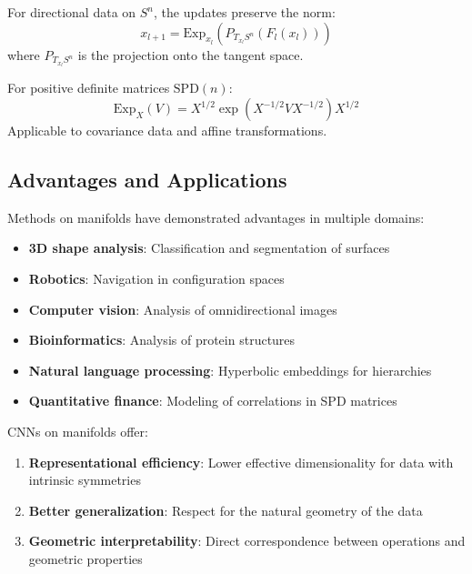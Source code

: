\begin{example}[Spheres (\(S^n\))]
For directional data on \(S^n\), the updates preserve the norm:
\[
x_{l+1} = \text{Exp}_{x_l}(P_{T_{x_l}S^n}(F_l(x_l)))
\]
where \(P_{T_{x_l}S^n}\) is the projection onto the tangent space.
\end{example}

\begin{example}
For positive definite matrices \(\text{SPD}(n)\):
\[
\text{Exp}_X(V) = X^{1/2} \exp(X^{-1/2}VX^{-1/2}) X^{1/2}
\]
Applicable to covariance data and affine transformations.
\end{example}

\subsection{Advantages and Applications}

Methods on manifolds have demonstrated advantages in multiple domains:

\begin{itemize}
    \item \textbf{3D shape analysis}: Classification and segmentation of surfaces
    \item \textbf{Robotics}: Navigation in configuration spaces
    \item \textbf{Computer vision}: Analysis of omnidirectional images
    \item \textbf{Bioinformatics}: Analysis of protein structures
    \item \textbf{Natural language processing}: Hyperbolic embeddings for hierarchies
    \item \textbf{Quantitative finance}: Modeling of correlations in SPD matrices
\end{itemize}

\begin{remark}\label{rem:ventajas_computacionales_riemannianas}
CNNs on manifolds offer:
\begin{enumerate}
	\item \textbf{Representational efficiency}: Lower effective dimensionality for data with intrinsic symmetries
	\item \textbf{Better generalization}: Respect for the natural geometry of the data
	\item \textbf{Geometric interpretability}: Direct correspondence between operations and geometric properties
\end{enumerate}
\end{remark}

